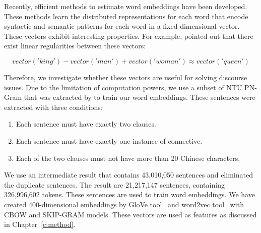 Recently, efficient methods to estimate word embeddings have been developed.
These methods learn the distributed representations for each word that encode
syntactic and semantic patterns for each word in a fixed-dimensional vector.
These vectors exhibit interesting properties. For example,
\cite{mikolov2013linguistic} pointed out that there exist linear regularities
between these vectors:

$$ vector('king') - vector('man') + vector('woman') \approx vector('queen') $$

Therefore, we investigate whether these vectors are useful for solving
discourse issues. Due to the limitation of computation powers, we use
a subset of NTU PN-Gram that was extracted by \cite{huang2014interpretation}
to train our word embeddings. These sentences were extracted with three conditions:

\begin{enumerate}
\item Each sentence must have exactly two clauses.
\item Each sentence must have exactly one instance of connective.
\item Each of the two clauses must not have more than 20 Chinese characters.
\end{enumerate}

We use an intermediate result that contains 43,010,050 sentences and eliminated
the duplicate sentences. The result are 21,217,147 sentences, containing
326,996,602 tokens. These sentences are used to train word embeddings.
We have created 400-dimensional embeddings by GloVe tool~\citep{pennington2014glove}
and word2vec tool~\citep{mikolov2013efficient,mikolov2013distributed} with CBOW and
SKIP-GRAM models. These vectors are used as features as discussed in Chapter~\ref{c:method}.

